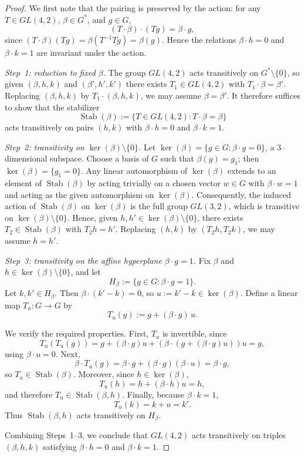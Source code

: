 \documentclass[12pt,twoside,]{amsart}
\theoremstyle{plain}
\theoremstyle{definition}
\begin{document}
\begin{proof}
We first note that the pairing is preserved by the action: for any
$T\in GL(4,2)$, $\beta\in G^*$, and $g\in G$,
\[
(T\cdot\beta)\cdot(Tg)=\beta\cdot g,
\]
since $(T\cdot\beta)(Tg)=\beta(T^{-1}Tg)=\beta(g)$.  Hence the relations
$\beta\cdot h=0$ and $\beta\cdot k=1$ are invariant under the action.

\medskip
\noindent\emph{Step~1: reduction to fixed $\beta$.}
The group $GL(4,2)$ acts transitively on $G^*\setminus\{0\}$, so given
$(\beta,h,k)$ and $(\beta',h',k')$ there exists $T_1\in GL(4,2)$ with
$T_1\cdot\beta=\beta'$.  Replacing $(\beta,h,k)$ by $T_1\cdot(\beta,h,k)$, we may
assume $\beta=\beta'$.  It therefore suffices to show that the stabilizer
\[
\operatorname{Stab}(\beta):=\{T\in GL(4,2):T\cdot\beta=\beta\}
\]
acts transitively on pairs $(h,k)$ with $\beta\cdot h=0$ and $\beta\cdot k=1$.

\medskip
\noindent\emph{Step~2: transitivity on $\ker(\beta)\setminus\{0\}$.}
Let $\ker(\beta)=\{g\in G:\beta\cdot g=0\}$, a $3$--dimensional subspace.
Choose a basis of $G$ such that $\beta(g)=g_1$; then $\ker(\beta)=\{g_1=0\}$.
Any linear automorphism of $\ker(\beta)$ extends to an element of $\operatorname{Stab}(\beta)$
by acting trivially on a chosen vector $w\in G$ with $\beta\cdot w=1$ and acting
as the given automorphism on $\ker(\beta)$.  Consequently, the induced action of
$\operatorname{Stab}(\beta)$ on $\ker(\beta)$ is the full group $GL(3,2)$, which is transitive
on $\ker(\beta)\setminus\{0\}$.  Hence, given $h,h'\in\ker(\beta)\setminus\{0\}$,
there exists $T_2\in\operatorname{Stab}(\beta)$ with $T_2h=h'$.  Replacing $(h,k)$ by
$(T_2h,T_2k)$, we may assume $h=h'$.

\medskip
\noindent\emph{Step~3: transitivity on the affine hyperplane $\beta\cdot g=1$.}
Fix $\beta$ and $h\in\ker(\beta)\setminus\{0\}$, and let
\[
H_\beta:=\{g\in G:\beta\cdot g=1\}.
\]
Let $k,k'\in H_\beta$.  Then $\beta\cdot(k'-k)=0$, so $u:=k'-k\in\ker(\beta)$.
Define a linear map $T_u:G\to G$ by
\[
T_u(g):=g+(\beta\cdot g)\,u.
\]

We verify the required properties.
First, $T_u$ is invertible, since
\[
T_u(T_u(g))=g+(\beta\cdot g)u+(\beta\cdot(g+(\beta\cdot g)u))u=g,
\]
using $\beta\cdot u=0$.  Next,
\[
\beta\cdot T_u(g)=\beta\cdot g+(\beta\cdot g)(\beta\cdot u)=\beta\cdot g,
\]
so $T_u\in\operatorname{Stab}(\beta)$.  Moreover, since $h\in\ker(\beta)$,
\[
T_u(h)=h+(\beta\cdot h)u=h,
\]
and therefore $T_u\in\operatorname{Stab}(\beta,h)$.  Finally, because $\beta\cdot k=1$,
\[
T_u(k)=k+u=k'.
\]
Thus $\operatorname{Stab}(\beta,h)$ acts transitively on $H_\beta$.

\medskip
Combining Steps~1--3, we conclude that $GL(4,2)$ acts transitively on triples
$(\beta,h,k)$ satisfying $\beta\cdot h=0$ and $\beta\cdot k=1$.
\end{proof}
\end{document}

